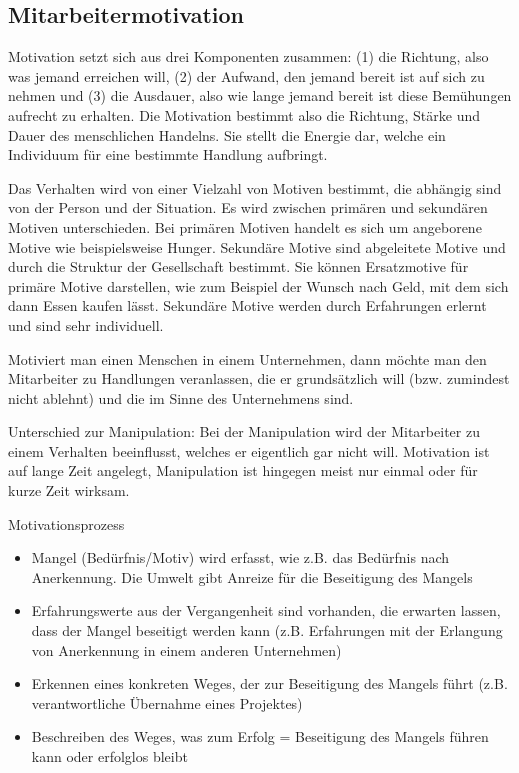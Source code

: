 
\subsection{Mitarbeitermotivation}
Motivation setzt sich aus drei Komponenten zusammen: (1) die Richtung, also was jemand erreichen will, (2) der Aufwand, den jemand bereit ist auf sich zu nehmen und (3) die Ausdauer, also wie lange jemand bereit ist diese Bemühungen aufrecht zu erhalten. Die Motivation bestimmt also die Richtung, Stärke und Dauer des menschlichen Handelns. Sie stellt die Energie dar, welche ein Individuum für eine bestimmte Handlung aufbringt.

Das Verhalten wird von einer Vielzahl von Motiven bestimmt, die abhängig sind von der Person und der Situation. Es wird zwischen primären und sekundären Motiven unterschieden. Bei primären Motiven handelt es sich um angeborene Motive wie beispielsweise Hunger. Sekundäre Motive sind abgeleitete Motive und durch die Struktur der Gesellschaft bestimmt. Sie können Ersatzmotive für primäre Motive darstellen, wie zum Beispiel der Wunsch nach Geld, mit dem sich dann Essen kaufen lässt. Sekundäre Motive werden durch Erfahrungen erlernt und sind sehr individuell.

Motiviert man einen Menschen in einem Unternehmen, dann möchte man den Mitarbeiter zu Handlungen veranlassen, die er grundsätzlich will (bzw. zumindest nicht ablehnt) und die im Sinne des Unternehmens sind.

Unterschied zur Manipulation: Bei der Manipulation wird der Mitarbeiter zu einem Verhalten beeinflusst, welches er eigentlich gar nicht will.
Motivation ist auf lange Zeit angelegt, Manipulation ist hingegen meist nur einmal oder für kurze Zeit wirksam.

Motivationsprozess
\begin{itemize}
	\item Mangel (Bedürfnis/Motiv) wird erfasst, wie z.B. das Bedürfnis nach Anerkennung. Die Umwelt gibt Anreize für die Beseitigung des Mangels
	\item Erfahrungswerte aus der Vergangenheit sind vorhanden, die erwarten lassen, dass der Mangel beseitigt werden kann (z.B. Erfahrungen mit der Erlangung von Anerkennung in einem anderen Unternehmen)
	\item Erkennen eines konkreten Weges, der zur Beseitigung des Mangels führt (z.B. verantwortliche Übernahme eines Projektes)
	\item Beschreiben des Weges, was zum Erfolg = Beseitigung des Mangels führen kann oder erfolglos bleibt
\end{itemize}

